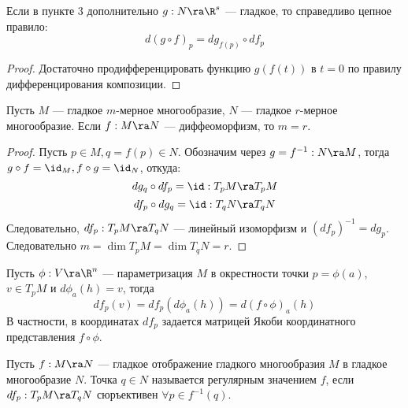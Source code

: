 \begin{corollary}
    Если в пункте 3 дополнительно \(g: N \ra \R^s\) --- гладкое, то справедливо цепное правило:
    \[d(g \circ f)_p = dg_{f(p)} \circ df_p\]
\end{corollary}
\begin{proof}
    Достаточно продифференцировать функцию \(g(f(t))\) в \(t = 0\) по правилу дифференцирования композиции.
\end{proof}

\begin{corollary}
    Пусть \(M\) --- гладкое \(m\)-мерное многообразие, \(N\) --- гладкое \(r\)-мерное многообразие. Если \(f: M \ra N\) --- диффеоморфизм, то \(m = r\).
\end{corollary}
\begin{proof}
    Пусть \(p \in M, q = f(p) \in N\). Обозначим через \(g = f^{-1}: N \ra M\), тогда \(g \circ f = \id_M, f \circ g = \id_N\), откуда:
    \[dg_q \circ df_p = \id: T_pM \ra T_pM\]
    \[df_p \circ dg_q = \id: T_qN \ra T_qN\]
    Следовательно, \(df_p: T_pM \ra T_qN\) --- линейный изоморфизм и \((df_p)^{-1} = dg_p\). Следовательно \(m = \dim T_pM = \dim T_qN = r\).
\end{proof}

\begin{note}
    Пусть \(\phi: V \ra \R^n\) --- параметризация \(M\) в окрестности точки \(p = \phi(a)\), \(v \in T_pM\) и \(d\phi_a(h) = v\), тогда 
    \[df_p(v) = df_p(d\phi_a(h)) = d(f \circ \phi)_a(h)\]
    В частности, в координатах \(df_p\) задается матрицей Якоби координатного представления \(f \circ \phi\).
\end{note}

\begin{definition}
    Пусть \(f: M \ra N\) --- гладкое отображение гладкого многообразия \(M\) в гладкое многообразие \(N\). Точка \(q \in N\) называется регулярным значением \(f\), если \(df_p: T_pM \ra T_qN\) сюръективен \(\forall p \in f^{-1}(q)\).
\end{definition}

